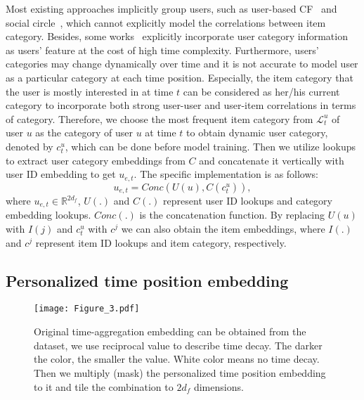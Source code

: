 \documentclass[preprint,12pt]{elsarticle}
\begin{document}
\begin{sloppypar}
Most existing approaches implicitly group users, such as user-based CF~\cite{chen2020deep, koohi2016user, bellogin2012using} and social circle~\cite{purushotham2012collaborative, qian2013personalized}, which cannot explicitly model the correlations between item category. Besides, some works~\cite{papagelis2005qualitative, yang2012circle} explicitly incorporate user category information as users' feature at the cost of high time complexity. Furthermore, users' categories may change dynamically over time and it is not accurate to model user as a particular category at each time position. Especially, the item category that the user is mostly interested in at time $t$ can be considered as her/his current category to incorporate both strong user-user and user-item correlations in terms of category. Therefore, we choose the most frequent item category from $ \mathcal{L}^{u}_t $ of user $u$ as the category of user $u$ at time $t$ to obtain dynamic user category, denoted by $c^u_t$, which can be done before model training. Then we utilize lookups to extract user category embeddings from $C$ and concatenate it vertically with user ID embedding to get $u_{e,t}$. The specific implementation is as follows:
\begin{equation}
u_{e,t} = Conc(U(u), C(c^u_t)),\label{eq:1}
\end{equation}
where $u_{e,t}\in \mathbb{R}^{2d_{f}}$, $ U(.) $ and $ C(.) $ represent user ID lookups and category embedding lookups. $Conc(.)$ is the concatenation function. By replacing $U(u)$ with $I(j)$ and $c^u_t$ with $c^j$ we can also obtain the item embeddings, where $I(.)$ and $c^j$ represent item ID lookups and item category, respectively.

\subsection{Personalized time position embedding}

\begin{figure}[ht]
	\centering
	\texttt{[image: Figure\_3.pdf]}
	\caption{Original time-aggregation embedding can be obtained from the dataset, we use reciprocal value to describe time decay. The darker the color, the smaller the value. White color means no time decay. Then we multiply (mask) the personalized time position embedding to it and tile the combination to $2d_f$ dimensions.}\label{fig:3}
\end{figure}


\end{sloppypar}
\end{document}
